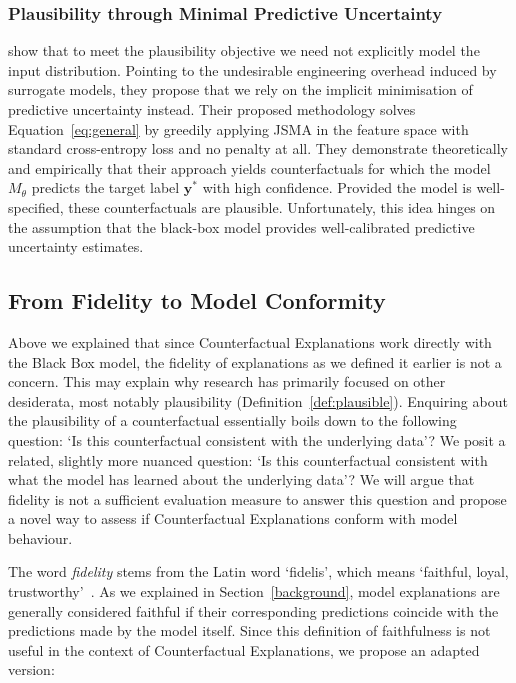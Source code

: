 \documentclass{article}
\begin{document}
\subsubsection{Plausibility through Minimal Predictive Uncertainty}

\citet{schut2021generating} show that to meet the plausibility objective we need not explicitly model the input distribution. Pointing to the undesirable engineering overhead induced by surrogate models, they propose that we rely on the implicit minimisation of predictive uncertainty instead. Their proposed methodology solves Equation~\ref{eq:general} by greedily applying JSMA in the feature space with standard cross-entropy loss and no penalty at all. They demonstrate theoretically and empirically that their approach yields counterfactuals for which the model $M_{\theta}$ predicts the target label $\mathbf{y}^*$ with high confidence. Provided the model is well-specified, these counterfactuals are plausible. Unfortunately, this idea hinges on the assumption that the black-box model provides well-calibrated predictive uncertainty estimates.

\subsection{From Fidelity to Model Conformity}

Above we explained that since Counterfactual Explanations work directly with the Black Box model, the fidelity of explanations as we defined it earlier is not a concern. This may explain why research has primarily focused on other desiderata, most notably plausibility (Definition~\ref{def:plausible}). Enquiring about the plausibility of a counterfactual essentially boils down to the following question: `Is this counterfactual consistent with the underlying data'? We posit a related, slightly more nuanced question: `Is this counterfactual consistent with what the model has learned about the underlying data'? We will argue that fidelity is not a sufficient evaluation measure to answer this question and propose a novel way to assess if Counterfactual Explanations conform with model behaviour. 

The word \textit{fidelity} stems from the Latin word `fidelis', which means `faithful, loyal, trustworthy'~\citep{mw2023fidelity}. As we explained in Section~\ref{background}, model explanations are generally considered faithful if their corresponding predictions coincide with the predictions made by the model itself. Since this definition of faithfulness is not useful in the context of Counterfactual Explanations, we propose an adapted version: 
\end{document}
